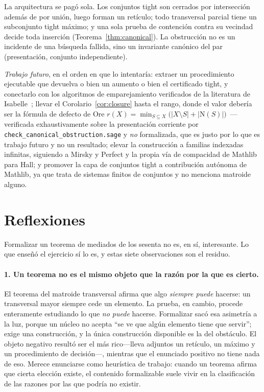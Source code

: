 \documentclass[11pt]{article}
\newcommand{\lean}[1]{\texttt{#1}}
\newcommand{\N}{\mathrm{N}}
\begin{document}
La arquitectura se pagó sola. Los conjuntos tight son cerrados por intersección además de por
unión, luego forman un retículo; todo transversal parcial tiene un subconjunto tight máximo; y una
sola prueba de contención contra su vecindad decide toda inserción
(Teorema~\ref{thm:canonical}). La obstrucción no es un incidente de una búsqueda fallida, sino un
invariante canónico del par (presentación, conjunto independiente).

\emph{Trabajo futuro}, en el orden en que lo intentaría: extraer un procedimiento ejecutable que
devuelva o bien un aumento o bien el certificado tight, y conectarlo con los algoritmos de
emparejamiento verificados de la literatura de Isabelle~\cite{itp2025}; llevar el
Corolario~\ref{cor:closure} hasta el rango, donde el valor debería ser la fórmula de defecto de
Ore
$r(X)=\min_{S\subseteq X}\bigl(|X\setminus S|+|\N(S)|\bigr)$~\cite{ore}---verificada exhaustivamente sobre la
presentación corriente por \lean{check\_canonical\_obstruction.sage} y \emph{no} formalizada, que es
justo por lo que es trabajo futuro y no un resultado; elevar la construcción a familias indexadas
infinitas, siguiendo a Mirsky y Perfect y la propia vía de compacidad de Mathlib para Hall; y
promover la capa de conjuntos tight a contribución autónoma de Mathlib, ya que trata de sistemas
finitos de conjuntos y no menciona matroide alguno.

\section{Reflexiones}\label{sec:reflections}

Formalizar un teorema de mediados de los sesenta no es, en sí, interesante. Lo que enseñó el
ejercicio sí lo es, y estas siete observaciones son el residuo.

\paragraph{1. Un teorema no es el mismo objeto que la razón por la que es cierto.}
El teorema del matroide transversal afirma que algo \emph{siempre puede} hacerse: un transversal
mayor siempre cede un elemento. La prueba, en cambio, procede enteramente estudiando lo que
\emph{no puede} hacerse. Formalizar sacó esa asimetría a la luz, porque un núcleo no acepta ``se ve
que algún elemento tiene que servir''; exige una construcción, y la única construcción disponible es
la del obstáculo. El objeto negativo resultó ser el más rico---lleva adjuntos un retículo, un máximo
y un procedimiento de decisión---, mientras que el enunciado positivo no tiene nada de eso. Merece
enunciarse como heurística de trabajo: cuando un teorema afirma que cierta elección existe, el
contenido formalizable suele vivir en la clasificación de las razones por las que podría no existir.
\end{document}

